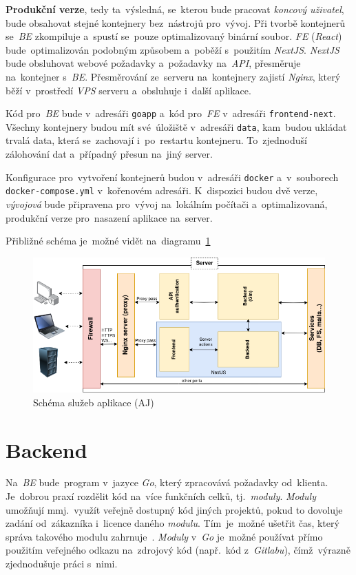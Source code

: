 \documentclass[11pt,a4paper]{report}
\let\oldacrshort\acrshort
\renewcommand{\acrshort}[1]{\emph{\normalsize\color[rgb]{0,0,0}\noindent\oldacrshort{#1}}}
\begin{document}
        \textbf{Produkční verze}, tedy ta~výsledná, se~kterou bude pracovat \emph{koncový uživatel}, bude obsahovat stejné kontejnery bez~nástrojů pro~vývoj. Při tvorbě kontejnerů se~\acrshort{BE} zkompiluje a~spustí se~pouze optimalizovaný binární soubor. \acrshort{FE} (\emph{React}) bude~optimalizován podobným způsobem a~poběží s~použitím \emph{NextJS}. \emph{NextJS} bude obsluhovat webové požadavky a~požadavky na~\acrshort{API}, přesměruje na~kontejner s~\acrshort{BE}. Přesměrování ze~serveru na~kontejnery zajistí \emph{Nginx}, který běží v~prostředí \emph{VPS} serveru a~obsluhuje i~další aplikace.

        Kód pro~\acrshort{BE} bude v~adresáři \texttt{goapp} a~kód pro~\acrshort{FE} v~adresáři \texttt{frontend-next}. Všechny kontejnery budou mít své~úložiště v~adresáři \texttt{data}, kam~budou ukládat trvalá data, která se~zachovají i~po~restartu kontejneru. To~zjednoduší zálohování dat a~případný přesun na~jiný server.

        Konfigurace pro~vytvoření kontejnerů budou v~adresáři \texttt{docker} a~v~souborech \texttt{docker-compose.yml} v~kořenovém adresáři. K~dispozici budou dvě verze, \emph{vývojová} bude připravena pro~vývoj na~lokálním počítači a~optimalizovaná, produkční verze pro~nasazení aplikace na~server.

        Přibližné schéma je~možné vidět na~diagramu~\ref{fig:appschema}
        
        \begin{figure}
            \centering
            \includegraphics[width=16cm]{files/img/server_scheme.png}
            \caption{Schéma služeb aplikace (AJ)}
            \label{fig:appschema}
        \end{figure}
        
        \section{Backend}
            Na~\acrshort{BE} bude~program v~jazyce \emph{Go}, který zpracovává požadavky od~klienta. Je~dobrou praxí rozdělit kód na~více funkčních celků, tj.~\emph{moduly}. \emph{Moduly} umožňují mmj.~využít veřejně dostupný kód jiných projektů, pokud to dovoluje zadání od~zákazníka i~licence daného \emph{modulu}. Tím~je~možné ušetřit čas, který správa takového modulu zahrnuje~\cite{Zimmerman2023:howtowritebetter}. \emph{Moduly} v~\emph{Go} je~možné používat přímo použitím veřejného odkazu na~zdrojový kód (např.~kód z~\emph{Gitlabu}), čímž~výrazně zjednodušuje práci s~nimi.
            
\end{document}
